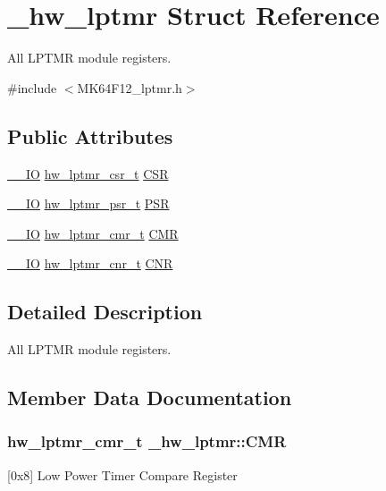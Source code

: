 \hypertarget{struct__hw__lptmr}{}\section{\+\_\+hw\+\_\+lptmr Struct Reference}
\label{struct__hw__lptmr}


All L\+P\+T\+MR module registers.  




{\ttfamily \#include $<$M\+K64\+F12\+\_\+lptmr.\+h$>$}

\subsection*{Public Attributes}
\begin{DoxyCompactItemize}
\item 
\hyperlink{core__sc300_8h_aec43007d9998a0a0e01faede4133d6be}{\+\_\+\+\_\+\+IO} \hyperlink{union__hw__lptmr__csr}{hw\+\_\+lptmr\+\_\+csr\+\_\+t} \hyperlink{struct__hw__lptmr_a49dc262582e692b9fcc2facf0b9170be}{C\+SR}
\item 
\hyperlink{core__sc300_8h_aec43007d9998a0a0e01faede4133d6be}{\+\_\+\+\_\+\+IO} \hyperlink{union__hw__lptmr__psr}{hw\+\_\+lptmr\+\_\+psr\+\_\+t} \hyperlink{struct__hw__lptmr_ae0367b5bdad58e47a433c96fcc191385}{P\+SR}
\item 
\hyperlink{core__sc300_8h_aec43007d9998a0a0e01faede4133d6be}{\+\_\+\+\_\+\+IO} \hyperlink{union__hw__lptmr__cmr}{hw\+\_\+lptmr\+\_\+cmr\+\_\+t} \hyperlink{struct__hw__lptmr_aa29f139e8cebefabb21f0f6bf566c154}{C\+MR}
\item 
\hyperlink{core__sc300_8h_aec43007d9998a0a0e01faede4133d6be}{\+\_\+\+\_\+\+IO} \hyperlink{union__hw__lptmr__cnr}{hw\+\_\+lptmr\+\_\+cnr\+\_\+t} \hyperlink{struct__hw__lptmr_a6ec4e166011a45f61b0df011f4f75823}{C\+NR}
\end{DoxyCompactItemize}


\subsection{Detailed Description}
All L\+P\+T\+MR module registers. 

\subsection{Member Data Documentation}
\subsubsection[{\texorpdfstring{C\+MR}{CMR}}]{ {\bf hw\+\_\+lptmr\+\_\+cmr\+\_\+t} \+\_\+hw\+\_\+lptmr\+::\+C\+MR}\hypertarget{struct__hw__lptmr_aa29f139e8cebefabb21f0f6bf566c154}{}\label{struct__hw__lptmr_aa29f139e8cebefabb21f0f6bf566c154}
\mbox{[}0x8\mbox{]} Low Power Timer Compare Register 
